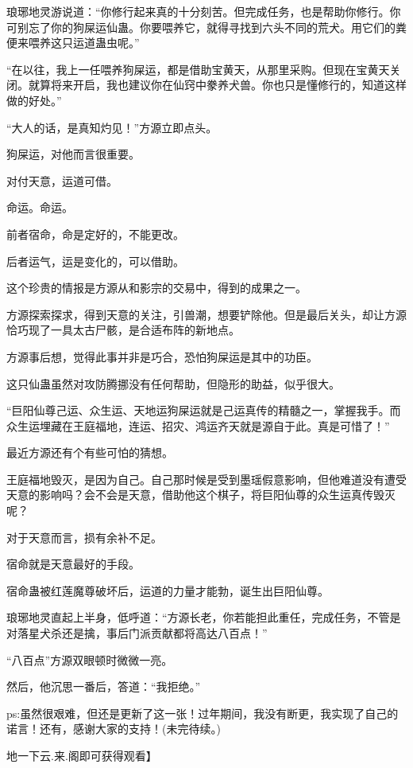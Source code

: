 \begin{this_body}
琅琊地灵游说道：“你修行起来真的十分刻苦。但完成任务，也是帮助你修行。你可别忘了你的狗屎运仙蛊。你要喂养它，就得寻找到六头不同的荒犬。用它们的粪便来喂养这只运道蛊虫呢。”

“在以往，我上一任喂养狗屎运，都是借助宝黄天，从那里采购。但现在宝黄天关闭。就算将来开启，我也建议你在仙窍中豢养犬兽。你也只是懂修行的，知道这样做的好处。”

“大人的话，是真知灼见！”方源立即点头。

狗屎运，对他而言很重要。

对付天意，运道可借。

命运。命运。

前者宿命，命是定好的，不能更改。

后者运气，运是变化的，可以借助。

这个珍贵的情报是方源从和影宗的交易中，得到的成果之一。

方源探索探求，得到天意的关注，引兽潮，想要铲除他。但是最后关头，却让方源恰巧现了一具太古尸骸，是合适布阵的新地点。

方源事后想，觉得此事并非是巧合，恐怕狗屎运是其中的功臣。

这只仙蛊虽然对攻防腾挪没有任何帮助，但隐形的助益，似乎很大。

“巨阳仙尊己运、众生运、天地运狗屎运就是己运真传的精髓之一，掌握我手。而众生运埋藏在王庭福地，连运、招灾、鸿运齐天就是源自于此。真是可惜了！”

最近方源还有个有些可怕的猜想。

王庭福地毁灭，是因为自己。自己那时候是受到墨瑶假意影响，但他难道没有遭受天意的影响吗？会不会是天意，借助他这个棋子，将巨阳仙尊的众生运真传毁灭呢？

对于天意而言，损有余补不足。

宿命就是天意最好的手段。

宿命蛊被红莲魔尊破坏后，运道的力量才能勃，诞生出巨阳仙尊。

琅琊地灵直起上半身，低呼道：“方源长老，你若能担此重任，完成任务，不管是对落星犬杀还是擒，事后门派贡献都将高达八百点！”

“八百点”方源双眼顿时微微一亮。

然后，他沉思一番后，答道：“我拒绝。”

ps:虽然很艰难，但还是更新了这一张！过年期间，我没有断更，我实现了自己的诺言！还有，感谢大家的支持！(未完待续。)

地一下云.来.阁即可获得观看】

\end{this_body}

